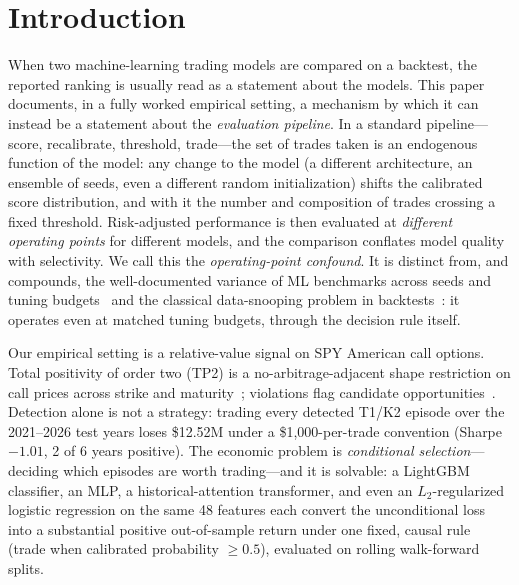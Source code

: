 \documentclass[sigconf,review,anonymous]{acmart}
\begin{document}


\maketitle

\section{Introduction}
\label{sec:intro}

When two machine-learning trading models are compared on a backtest, the reported ranking is usually read as a statement about the models. This paper documents, in a fully worked empirical setting, a mechanism by which it can instead be a statement about the \emph{evaluation pipeline}. In a standard pipeline---score, recalibrate, threshold, trade---the set of trades taken is an endogenous function of the model: any change to the model (a different architecture, an ensemble of seeds, even a different random initialization) shifts the calibrated score distribution, and with it the number and composition of trades crossing a fixed threshold. Risk-adjusted performance is then evaluated at \emph{different operating points} for different models, and the comparison conflates model quality with selectivity. We call this the \emph{operating-point confound}. It is distinct from, and compounds, the well-documented variance of ML benchmarks across seeds and tuning budgets~\cite{bouthillier2021accounting,dodge2019show,melis2018state,lucic2018gans,agarwal2021deep} and the classical data-snooping problem in backtests~\cite{white2000reality,hansen2005spa,harvey2016crosssection,bailey2014deflated}: it operates even at matched tuning budgets, through the decision rule itself.

Our empirical setting is a relative-value signal on SPY American call options. Total positivity of order two (TP2) is a no-arbitrage-adjacent shape restriction on call prices across strike and maturity~\cite{glasserman2026tp2theory,glasserman2023convexity}; violations flag candidate opportunities~\cite{glasserman2025tp2}. Detection alone is not a strategy: trading every detected T1/K2 episode over the 2021--2026 test years loses \$12.52M under a \$1{,}000-per-trade convention (Sharpe $-1.01$, 2 of 6 years positive). The economic problem is \emph{conditional selection}---deciding which episodes are worth trading---and it is solvable: a LightGBM classifier, an MLP, a historical-attention transformer, and even an $L_2$-regularized logistic regression on the same 48 features each convert the unconditional loss into a substantial positive out-of-sample return under one fixed, causal rule (trade when calibrated probability $\ge0.5$), evaluated on rolling walk-forward splits.
\end{document}
